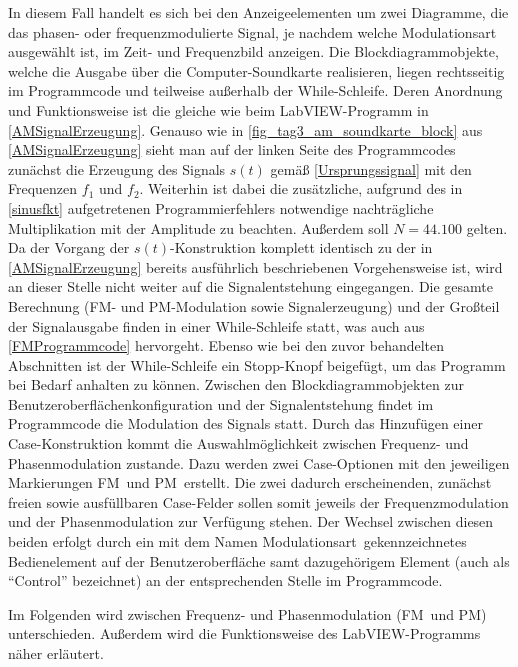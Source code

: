 \documentclass[
a4paper,
12pt,
pagesize,
ngerman
]{scrartcl}
\begin{document}
	\noindent In diesem Fall handelt es sich bei den Anzeigeelementen um zwei Diagramme, die das phasen- oder frequenzmodulierte Signal, je nachdem welche Modulationsart ausgewählt ist, im Zeit- und Frequenzbild anzeigen. 
	Die Blockdiagrammobjekte, welche die Ausgabe über die Computer-Soundkarte realisieren, liegen rechtsseitig im Programmcode und teilweise außerhalb der While-Schleife. 
	Deren Anordnung und Funktionsweise ist die gleiche wie beim LabVIEW-Programm in \cref{AMSignalErzeugung}. 
	Genauso wie in \cref{fig_tag3_am_soundkarte_block} aus \cref{AMSignalErzeugung} sieht man auf der linken Seite des Programmcodes zunächst die Erzeugung des Signals $s(t)$ gemäß \cref{Ursprungssignal} mit den Frequenzen $f_1$ und $f_2$. 
	Weiterhin ist dabei die zusätzliche, aufgrund des in \cref{sinusfkt} aufgetretenen Programmierfehlers notwendige nachträgliche Multiplikation mit der Amplitude zu beachten. 
	Außerdem soll $N = 44.100$ gelten. 
	Da der Vorgang der $s(t)$-Konstruktion komplett identisch zu der in \cref{AMSignalErzeugung} bereits ausführlich beschriebenen Vorgehensweise ist, wird an dieser Stelle nicht weiter auf die Signalentstehung eingegangen. 
	Die gesamte Berechnung (FM- und PM-Modulation sowie Signalerzeugung) und der Großteil der Signalausgabe finden in einer While-Schleife statt, was auch aus \cref{FMProgrammcode} hervorgeht.
	Ebenso wie bei den zuvor behandelten Abschnitten ist der While-Schleife ein \glqq Stopp\grqq -Knopf beigefügt, um das Programm bei Bedarf anhalten zu können.
	Zwischen den Blockdiagrammobjekten zur Benutzeroberflächenkonfiguration und der Signalentstehung findet im Programmcode die Modulation des Signals statt.
	Durch das Hinzufügen einer Case-Konstruktion kommt die Auswahlmöglichkeit zwischen Frequenz- und Phasenmodulation zustande.
	Dazu werden zwei Case-Optionen mit den jeweiligen Markierungen \glqq FM\grqq\ und \glqq PM\grqq\ erstellt. 
	Die zwei dadurch erscheinenden, zunächst freien sowie ausfüllbaren Case-Felder sollen somit jeweils der Frequenzmodulation und der Phasenmodulation zur Verfügung stehen.
	Der Wechsel zwischen diesen beiden erfolgt durch ein mit dem Namen \glqq Modulationsart\grqq\ gekennzeichnetes Bedienelement auf der Benutzeroberfläche samt dazugehörigem Element (auch als \enquote{Control} bezeichnet) an der entsprechenden Stelle im Programmcode.
		
	Im Folgenden wird zwischen Frequenz- und Phasenmodulation (\glqq FM\grqq\ und \glqq PM\grqq ) unterschieden.
	Außerdem wird die Funktionsweise des LabVIEW-Programms näher erläutert.
	
\end{document}
